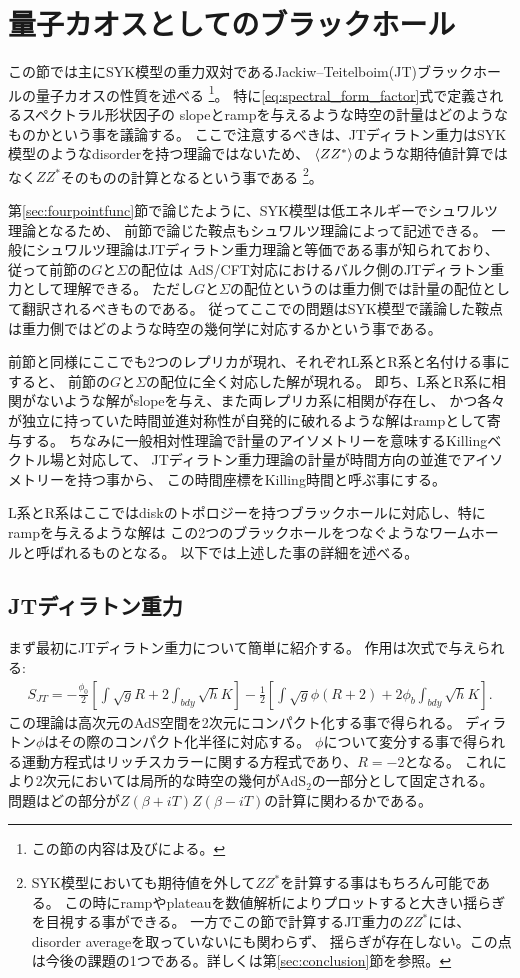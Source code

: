 \section{量子カオスとしてのブラックホール\label{sec:gravity}}
この節では主にSYK模型の重力双対であるJackiw--Teitelboim(JT)ブラックホールの量子カオスの性質を述べる
\footnote{この節の内容は\cite{polchinski_chaos}及び\cite{stanford_chaos}による。}。
特に\eqref{eq:spectral_form_factor}式で定義されるスペクトラル形状因子の
slopeとrampを与えるような時空の計量はどのようなものかという事を議論する。
ここで注意するべきは、JTディラトン重力はSYK模型のようなdisorderを持つ理論ではないため、
$\langle ZZ^* \rangle$のような期待値計算ではなく$ZZ^*$そのものの計算となるという事である
\footnote{SYK模型においても期待値を外して$ZZ^*$を計算する事はもちろん可能である。
この時にrampやplateauを数値解析によりプロットすると大きい揺らぎを目視する事ができる。
一方でこの節で計算するJT重力の$ZZ^*$には、disorder averageを取っていないにも関わらず、
揺らぎが存在しない。この点は今後の課題の1つである。詳しくは第\ref{sec:conclusion}節を参照。}。

第\ref{sec:fourpointfunc}節で論じたように、SYK模型は低エネルギーでシュワルツ理論となるため、
前節で論じた鞍点もシュワルツ理論によって記述できる。
一般にシュワルツ理論はJTディラトン重力理論と等価である事が知られており、従って前節の$G$と$\Sigma$の配位は
AdS/CFT対応におけるバルク側のJTディラトン重力として理解できる。
ただし$G$と$\Sigma$の配位というのは重力側では計量の配位として翻訳されるべきものである。
従ってここでの問題はSYK模型で議論した鞍点は重力側ではどのような時空の幾何学に対応するかという事である。

前節と同様にここでも2つのレプリカが現れ、それぞれL系とR系と名付ける事にすると、
前節の$G$と$\Sigma$の配位に全く対応した解が現れる。
即ち、L系とR系に相関がないような解がslopeを与え、また両レプリカ系に相関が存在し、
かつ各々が独立に持っていた時間並進対称性が自発的に破れるような解はrampとして寄与する。
ちなみに一般相対性理論で計量のアイソメトリーを意味するKillingベクトル場と対応して、
JTディラトン重力理論の計量が時間方向の並進でアイソメトリーを持つ事から、
この時間座標をKilling時間と呼ぶ事にする。

L系とR系はここではdiskのトポロジーを持つブラックホールに対応し、特にrampを与えるような解は
この2つのブラックホールをつなぐようなワームホールと呼ばれるものとなる。
以下では上述した事の詳細を述べる。

\subsection{JTディラトン重力}
まず最初にJTディラトン重力について簡単に紹介する。
作用は次式で与えられる:
\begin{align}
	S_{JT} = -\frac{\phi_0}{2}\left[\int \sqrt{g}R + 2\int_{bdy}\sqrt{h}K \right]
			-\frac{1}{2}\left[
				\int \sqrt{g}\phi(R+2) + 2\phi_b\int_{bdy}\sqrt{h}K
			\right].
\end{align}
この理論は高次元のAdS空間を2次元にコンパクト化する事で得られる。
ディラトン$\phi$はその際のコンパクト化半径に対応する。
$\phi$について変分する事で得られる運動方程式はリッチスカラーに関する方程式であり、$R = -2$となる。
これにより2次元においては局所的な時空の幾何が$\mathrm{AdS}_2$の一部分として固定される。
問題はどの部分が$Z(\beta + iT)Z(\beta - iT)$の計算に関わるかである。


